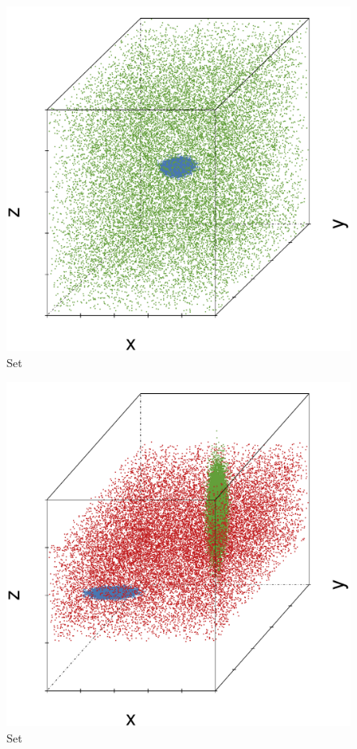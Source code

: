 \begin{subfigure}{0.23\textwidth}
	\centering
	\includegraphics[width=\textwidth]{3/img/datasetplot_baakman_1_60000.pdf}
	\caption{Set \baakmanOne}
	\label{fig:3:simulated:datasets:baakman1}
\end{subfigure}
\begin{subfigure}{0.23\textwidth}
	\centering
	\includegraphics[width=\textwidth]{3/img/datasetplot_baakman_2_60000.pdf}
	\caption{Set \baakmanTwo}
	\label{fig:3:simulated:datasets:baakman2}
\end{subfigure}	
